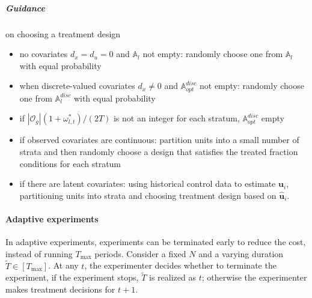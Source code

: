 \documentclass[twoside]{article}
\begin{document}
\subparagraph*{Guidance} on choosing a treatment design
\begin{itemize}
    \item no covariates $d_x=d_u=0$ and $\mathbb{A}_l$ not empty: randomly choose one from $\mathbb{A}_l$ with equal probability
    \item when discrete-valued covariates $d_x\neq 0$ and $\mathbb{A}^{disc}_{opt}$ not empty: randomly choose one from $\mathbb{A}^{disc}_l$ with equal probability 
    \item if $\left\vert \mathcal{O}_g \right\vert(1+\omega^*_{l,t})/(2T)$ is not an integer for each stratum, $\mathbb{A}^{disc}_{opt}$ empty 
    \item if observed covariates are continuous: partition units into a small number of strata and then randomly choose a design that satisfies the treated fraction conditions for each stratum
    \item if there are latent covariates: using historical control data to estimate $\mathbf{u}_i$, partitioning units into strata and choosing treatment design based on $\hat{\mathbf{u}}_i$.
\end{itemize}

\paragraph*{Adaptive experiments}
In adaptive experiments, experiments can be terminated early to reduce the cost, instead of running $T_{\max}$ periods. Consider a fixed $N$ and a varying duration $\tilde{T}\in\left[T_{\max}\right]$. At any $t$, the experimenter decides whether to terminate the experiment, if the experiment stops, $\tilde{T}$ is realized as $t$; otherwise the experimenter makes treatment decisions for $t+1$.
\end{document}
